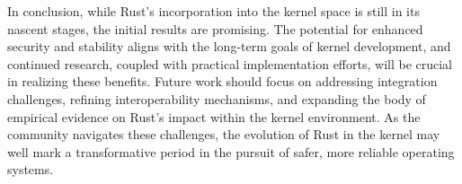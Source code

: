 \documentclass[sigconf]{acmart}
\begin{document}
In conclusion, while Rust's incorporation into the kernel space is still in its nascent stages, the
initial results are promising. The potential for enhanced security and stability aligns with the
long-term goals of kernel development, and continued research, coupled with practical implementation
efforts, will be crucial in realizing these benefits. Future work should focus on addressing
integration challenges, refining interoperability mechanisms, and expanding the body of empirical
evidence on Rust's impact within the kernel environment. As the community navigates these
challenges, the evolution of Rust in the kernel may well mark a transformative period in the pursuit
of safer, more reliable operating systems.

\balance



\end{document}
